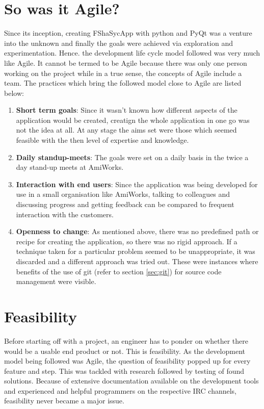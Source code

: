 \section{So was it Agile?}
Since its inception, creating FShaSycApp with python and PyQt was a venture into the unknown and finally the goals were achieved via exploration and experimentation. Hence. the development life cycle model followed was very much like Agile. It cannot be termed to be Agile because there was only one person working on the project while in a true sense, the concepts of Agile include a team. The practices which bring the followed model close to Agile are listed below:
\begin{enumerate}
\item \textbf{Short term goals}: Since it wasn't known how different aspects of the application would be created, creatign the whole application in one go was not the idea at all. At any stage the aims set were those which seemed feasible with the then level of expertise and knowledge.
\item \textbf{Daily standup-meets}: The goals were set on a daily basis in the twice a day stand-up meets at AmiWorks. 
\item \textbf{Interaction with end users}: Since the application was being developed for use in a small organisation like AmiWorks, talking to colleagues and discussing progress and getting feedback can be compared to frequent interaction with the customers.
\item \textbf{Openness to change}: As mentioned above, there was no predefined path or recipe for creating the application, so there was no rigid approach. If a technique taken for a particular problem seemed to be unappropriate, it was discarded and a different approach was tried out. These were instances where benefits of the use of git (refer to section \ref{sec:git}) for source code management were visible.
\end{enumerate}

\section{Feasibility}
Before starting off with a project, an engineer has to ponder on whether there would be a usable  end product or not. This is feasibility. As the development model being followed was Agile, the question of feasibility popped up for every feature and step. This was tackled with research followed by testing of found solutions. Because of extensive documentation available on the development tools and experienced and helpful programmers on the respective IRC channels, feasibility never became a major issue.
